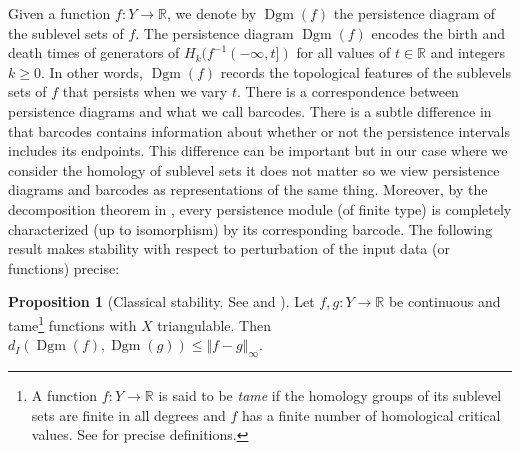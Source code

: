 \documentclass[10pt,a4paper]{article}
\theoremstyle{definition}
\newtheorem{prop}{Proposition}[thm]
\newcommand{\R}{\mathbb{R}}
\begin{document}
Given a function $f\colon Y\to\R$, we denote by $\operatorname{Dgm}(f)$ the persistence diagram of the sublevel sets of $f$. The persistence diagram $\operatorname{Dgm}(f)$ encodes the birth and death times of generators of $H_k(f^{-1}(-\infty, t])$ for all values of $t\in\R$ and integers $k\geq 0$. In other words, $\operatorname{Dgm}(f)$ records the topological features of the sublevels sets of $f$ that persists when we vary $t$. There is a correspondence between persistence diagrams and what we call barcodes. There is a subtle difference in that barcodes contains information about whether or not the persistence intervals includes its endpoints. This difference can be important but in our case where we consider the homology of sublevel sets it does not matter so we view persistence diagrams and barcodes as representations of the same thing. Moreover, by the decomposition theorem in \autocite{Crawley2012}, every persistence module (of finite type) is completely characterized (up to isomorphism) by its corresponding barcode. The following result makes stability with respect to perturbation of the input data (or functions) precise:
\begin{prop}[Classical stability. See \autocite{cohen2005stability} and \autocite{Chazal2012}]
	Let $f,g\colon Y\to\R$ be continuous and tame\footnote{A function $f\colon Y\to\R$ is said to be \textit{tame} if the homology groups of its sublevel sets are finite in all degrees and $f$ has a finite number of homological critical values. See \autocite{cohen2005stability} for precise definitions.} functions with $X$ triangulable. Then $d_I(\operatorname{Dgm}(f), \operatorname{Dgm}(g))\leq\Vert f-g\Vert_\infty$.
\end{prop}
\end{document}
